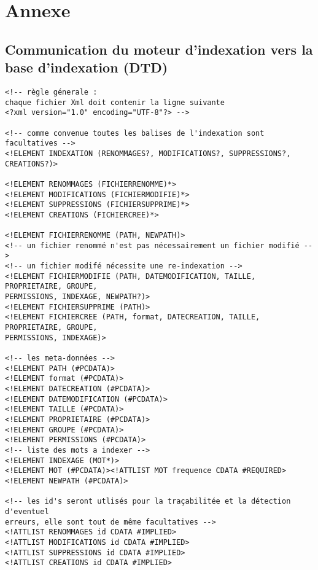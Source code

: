 \section{Annexe}

\subsection{Communication du moteur d'indexation vers la base d'indexation (DTD)}
\begin{verbatim}
<!-- règle génerale :
chaque fichier Xml doit contenir la ligne suivante
<?xml version="1.0" encoding="UTF-8"?> -->

<!-- comme convenue toutes les balises de l'indexation sont facultatives -->
<!ELEMENT INDEXATION (RENOMMAGES?, MODIFICATIONS?, SUPPRESSIONS?, CREATIONS?)>

<!ELEMENT RENOMMAGES (FICHIERRENOMME)*>		
<!ELEMENT MODIFICATIONS (FICHIERMODIFIE)*>	
<!ELEMENT SUPPRESSIONS (FICHIERSUPPRIME)*>
<!ELEMENT CREATIONS (FICHIERCREE)*>		

<!ELEMENT FICHIERRENOMME (PATH, NEWPATH)>
<!-- un fichier renommé n'est pas nécessairement un fichier modifié -->
<!-- un fichier modifé nécessite une re-indexation --> 
<!ELEMENT FICHIERMODIFIE (PATH, DATEMODIFICATION, TAILLE, PROPRIETAIRE, GROUPE, 
PERMISSIONS, INDEXAGE, NEWPATH?)>
<!ELEMENT FICHIERSUPPRIME (PATH)>
<!ELEMENT FICHIERCREE (PATH, format, DATECREATION, TAILLE, PROPRIETAIRE, GROUPE, 
PERMISSIONS, INDEXAGE)>

<!-- les meta-données --> 
<!ELEMENT PATH (#PCDATA)>
<!ELEMENT format (#PCDATA)>
<!ELEMENT DATECREATION (#PCDATA)>
<!ELEMENT DATEMODIFICATION (#PCDATA)>
<!ELEMENT TAILLE (#PCDATA)>
<!ELEMENT PROPRIETAIRE (#PCDATA)>
<!ELEMENT GROUPE (#PCDATA)>
<!ELEMENT PERMISSIONS (#PCDATA)>
<!-- liste des mots a indexer -->
<!ELEMENT INDEXAGE (MOT*)>
<!ELEMENT MOT (#PCDATA)><!ATTLIST MOT frequence CDATA #REQUIRED>
<!ELEMENT NEWPATH (#PCDATA)>

<!-- les id's seront utlisés pour la traçabilitée et la détection d'eventuel 
erreurs, elle sont tout de même facultatives --> 
<!ATTLIST RENOMMAGES id CDATA #IMPLIED>
<!ATTLIST MODIFICATIONS id CDATA #IMPLIED>
<!ATTLIST SUPPRESSIONS id CDATA #IMPLIED>
<!ATTLIST CREATIONS id CDATA #IMPLIED>
\end{verbatim}

